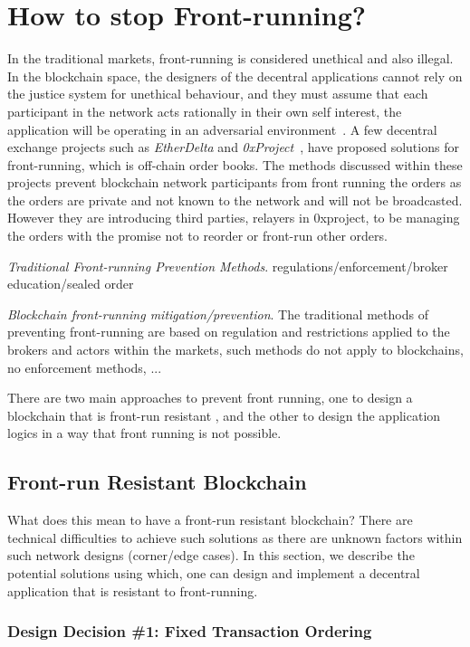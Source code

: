\section{How to stop Front-running?}
In the traditional markets, front-running is considered unethical and also illegal. In the blockchain space, the designers of the decentral applications cannot rely on the justice system for unethical behaviour, and they must assume that each participant in the network acts rationally in their own self interest, the application will be operating in an adversarial environment~\cite{0xfrontrunning:online}.
A few decentral exchange projects such as \textit{EtherDelta} and \textit{0xProject}~\cite{warren20170x}, have proposed solutions for front-running, which is off-chain order books. The methods discussed within these projects prevent blockchain network participants from front running the orders as the orders are private and not known to the network and will not be broadcasted. However they are introducing third parties, \eg relayers in 0xproject, to be managing the orders with the promise not to reorder or front-run other orders. 

\emph{Traditional Front-running Prevention Methods}. regulations/enforcement/broker education/sealed order


\emph{Blockchain front-running mitigation/prevention}. The traditional methods of preventing front-running are based on regulation and restrictions applied to the brokers and actors within the markets, such methods do not apply to blockchains, no enforcement methods, ... 

There are two main approaches to prevent front running, one to design a blockchain that is front-run resistant , and the other to design the application logics in a way that front running is not possible. 


\subsection{Front-run Resistant Blockchain}
What does this mean to have a front-run resistant blockchain?  There are technical difficulties to achieve such solutions as there are unknown factors within such network designs (corner/edge cases). In this section, we describe the potential solutions using which, one can design and implement a decentral application that is resistant to front-running.

\subsubsection{Design Decision \#1: Fixed Transaction Ordering\newline}

